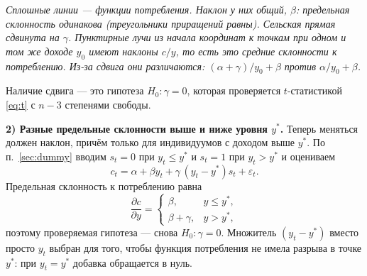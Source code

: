 \begin{solution}
\begin{center}
\smallskip
{\small\itshape Сплошные линии — функции потребления. Наклон у них общий,
$\beta$: предельная склонность одинакова (треугольники приращений равны).
Сельская прямая сдвинута на $\gamma$. Пунктирные лучи из начала координат
к точкам при одном и том же доходе $y_0$ имеют наклоны $c/y$, то есть это
средние склонности к потреблению. Из-за сдвига они различаются:
$(\alpha + \gamma)/y_0 + \beta$ против $\alpha/y_0 + \beta$.\par}
\end{center}

Наличие сдвига — это гипотеза $H_0\colon \gamma = 0$, которая проверяется
$t$-статистикой \eqref{eq:t} с $n - 3$ степенями свободы.

\medskip
\textbf{2) Разные предельные склонности выше и ниже уровня $y^{*}$.} Теперь
меняться должен наклон, причём только для индивидуумов с доходом выше $y^{*}$.
По п.~\ref{sec:dummy} вводим $s_t = 0$ при $y_t \leqslant y^{*}$ и $s_t = 1$ при
$y_t > y^{*}$ и оцениваем
\[
  c_t = \alpha + \beta y_t + \gamma\,(y_t - y^{*})s_t + \varepsilon_t .
\]
Предельная склонность к потреблению равна
\[
  \frac{\partial c}{\partial y} =
  \begin{cases}
    \beta, & y \leqslant y^{*}, \\[2pt]
    \beta + \gamma, & y > y^{*},
  \end{cases}
\]
поэтому проверяемая гипотеза — снова $H_0\colon \gamma = 0$. Множитель
$(y_t - y^{*})$ вместо просто $y_t$ выбран для того, чтобы функция потребления
не имела разрыва в точке $y^{*}$: при $y_t = y^{*}$ добавка обращается в нуль.
\end{solution}



